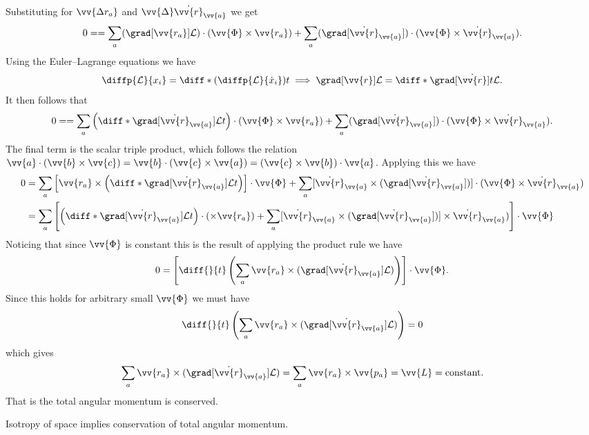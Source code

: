 \documentclass[fleqn]{NotesClass}
\newcommand*{\lagrangian}{\mathcal{L}}
\begin{document}
    Substituting for \(\vv{\Delta r_a}\) and \(\vv{\Delta}\dot{\vv{r}}_{\vv{a}}\) we get
    \begin{equation}
        0 =  = \sum_a (\grad[\vv{r_a}]\lagrangian) \cdot (\vv{\Phi} \times \vv{r_a}) + \sum_a (\grad[\dot{\vv{r}}_{\vv{a}}]) \cdot (\vv{\Phi} \times \dot{\vv{r}}_{\vv{a}}).
    \end{equation}
    Using the Euler--Lagrange equations we have
    \begin{equation}
        \diffp{\lagrangian}{x_i} = \diff*{\left( \diffp{\lagrangian}{\dot{x}_i} \right)}{t} \implies \grad[\vv{r}] \lagrangian = \diff*{\grad[\dot{\vv{r}}]}{t} \lagrangian.
    \end{equation}
    It then follows that
    \begin{equation}
        0 =  = \sum_a \left( \diff*{\grad[\dot{\vv{r}}_{\vv{a}}] \lagrangian}{t} \right) \cdot (\vv{\Phi} \times \vv{r_a}) + \sum_a (\grad[\dot{\vv{r}}_{\vv{a}}]) \cdot (\vv{\Phi} \times \dot{\vv{r}}_{\vv{a}}).
    \end{equation}
    The final term is the scalar triple product, which follows the relation \(\vv{a} \cdot (\vv{b} \times \vv{c}) = \vv{b} \cdot (\vv{c} \times \vv{a}) = (\vv{c}\times\vv{b})\cdot\vv{a}\).
    Applying this we have
    \begin{align}
        0 &= \sum_a \left[ \vv{r_a} \times \left( \diff*{\grad[\dot{\vv{r}}_{\vv{a}}] \lagrangian}{t} \right) \right] \cdot\vv{\Phi} + \sum_a [\dot{\vv{r}}_{\vv{a}} \times (\grad[\dot{\vv{r}}_{\vv{a}}])] \cdot (\vv{\Phi} \times \dot{\vv{r}}_{\vv{a}})\\
        &= \sum_a \left[ \left( \diff*{\grad[\dot{\vv{r}}_{\vv{a}}] \lagrangian}{t} \right) \cdot ( \times \vv{r_a}) + \sum_a [\dot{\vv{r}}_{\vv{a}} \times (\grad[\dot{\vv{r}}_{\vv{a}}])] \times \dot{\vv{r}}_{\vv{a}}) \right] \cdot \vv{\Phi}
    \end{align}
    Noticing that since \(\vv{\Phi}\) is constant this is the result of applying the product rule we have
    \begin{equation}
        0 = \left[ \diff{}{t} \left( \sum_a \vv{r_a}\times (\grad[\dot{\vv{r}}_{\vv{a}}] \lagrangian) \right) \right] \cdot \vv{\Phi}.
    \end{equation}
    Since this holds for arbitrary small \(\vv{\Phi}\) we must have
    \begin{equation}
        \diff{}{t}\left( \sum_a \vv{r_a}\times (\grad[\dot{\vv{r}}_{\vv{a}}] \lagrangian) \right) = 0
    \end{equation}
    which gives
    \begin{equation}
        \sum_a \vv{r_a}\times (\grad[\dot{\vv{r}}_{\vv{a}}] \lagrangian) = \sum_{a} \vv{r_a} \times \vv{p_a} = \vv{L} = \text{constant}.
    \end{equation}
    That is the total angular momentum is conserved.
    \begin{important}
        Isotropy of space implies conservation of total angular momentum.
    \end{important}
    
\end{document}
